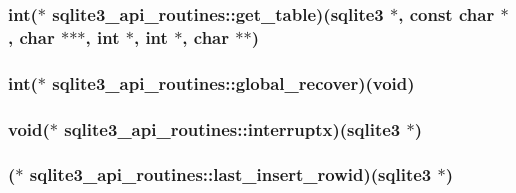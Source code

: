 \hypertarget{structsqlite3__api__routines_a49be6136a17441b04e3feec330d9dd52}{
\subsubsection[{get\-\_\-table}]{\setlength{\rightskip}{0pt plus 5cm}int($\ast$ sqlite3\-\_\-api\-\_\-routines\-::get\-\_\-table)({\bf sqlite3} $\ast$, const char $\ast$, char $\ast$$\ast$$\ast$, int $\ast$, int $\ast$, char $\ast$$\ast$)}}\label{structsqlite3__api__routines_a49be6136a17441b04e3feec330d9dd52}
\hypertarget{structsqlite3__api__routines_a9b90b5ea9b2fae5a60b9ddc86c72e1a8}{
\subsubsection[{global\-\_\-recover}]{\setlength{\rightskip}{0pt plus 5cm}int($\ast$ sqlite3\-\_\-api\-\_\-routines\-::global\-\_\-recover)(void)}}\label{structsqlite3__api__routines_a9b90b5ea9b2fae5a60b9ddc86c72e1a8}
\hypertarget{structsqlite3__api__routines_a3cfec591003c4e8b1f1bdb82a80b8e19}{
\subsubsection[{interruptx}]{\setlength{\rightskip}{0pt plus 5cm}void($\ast$ sqlite3\-\_\-api\-\_\-routines\-::interruptx)({\bf sqlite3} $\ast$)}}\label{structsqlite3__api__routines_a3cfec591003c4e8b1f1bdb82a80b8e19}
\hypertarget{structsqlite3__api__routines_aeeda8d84c8060c99e24d97ae60bf6046}{
\subsubsection[{last\-\_\-insert\-\_\-rowid}]{($\ast$ sqlite3\-\_\-api\-\_\-routines\-::last\-\_\-insert\-\_\-rowid)({\bf sqlite3} $\ast$)}}\label{structsqlite3__api__routines_aeeda8d84c8060c99e24d97ae60bf6046}
